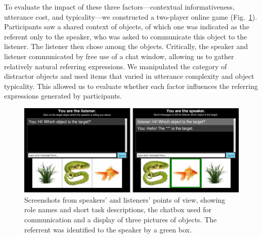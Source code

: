 \documentclass[10pt,letterpaper]{article}
\newcommand{\figref}[1]{Fig.~\ref{#1}}
\begin{document}

To evaluate the impact of these three factors---contextual informativeness, utterance cost, and typicality---we constructed a two-player online game (\figref{fig:procedure}). Participants saw a shared context of objects, of which one was indicated as the referent only to the speaker, who was asked to communicate this object to the listener. The listener then chose among the objects. Critically, the speaker and listener communicated by free use of a chat window, allowing us to gather relatively natural referring expressions. We manipulated the category of distractor objects and used items that varied in utterance complexity and object typicality. This allowed us to evaluate whether each factor influences the referring expressions generated by participants.%


\begin{figure}[tb]
\centering
\includegraphics[width=.5\textwidth]{graphs/procedure}
\caption{Screenshots from speakers' and listeners' points of view, showing role names and short task descriptions, the chatbox used for communication and a display of three pictures of objects. The referrent was identified to the speaker by a green box.}
\label{fig:procedure}
\end{figure}
\end{document}
